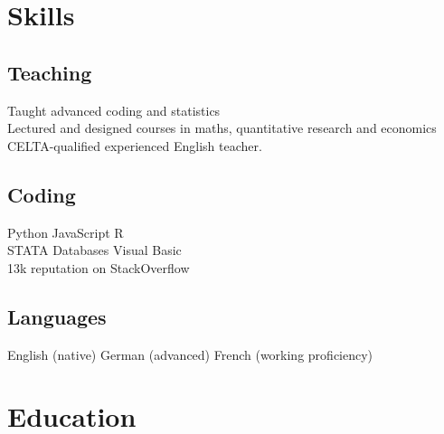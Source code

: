 \documentclass[a4paper,nomath]{deedy-resume} %
\begin{document}
\hfill
%
\begin{minipage}[t]{0.3\textwidth} %


    \section{Skills}

    \subsection{Teaching}
    \textbullet{} Taught advanced coding and statistics \\
    \textbullet{} Lectured and designed courses in maths, quantitative research and economics \\
    \textbullet{} CELTA-qualified experienced English teacher. \\
    
    \subsection{Coding}

    Python \textbullet{} JavaScript \textbullet{} R \\
    STATA \textbullet{} Databases \textbullet{} Visual Basic \\
    13k reputation on StackOverflow

    \sectionspace %

    \subsection{Languages}
    English (native) \textbullet{} German (advanced) \textbullet{} French (working proficiency)


    \section{Education} 
    

\end{minipage}
\end{document}
